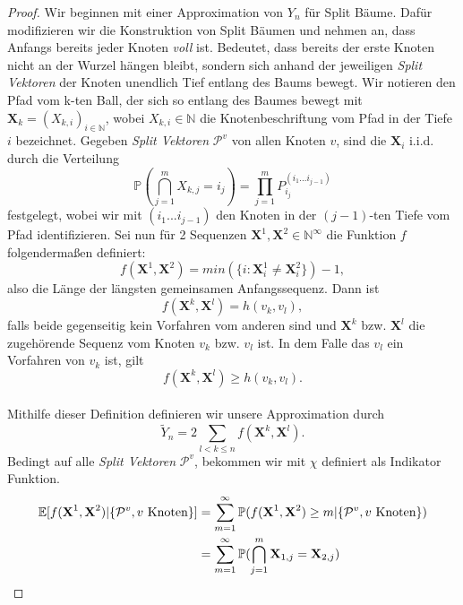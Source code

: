 \begin{proof}
  Wir beginnen mit einer Approximation von $Y_n$ für Split Bäume. Dafür modifizieren wir die Konstruktion von Split Bäumen und nehmen an, dass Anfangs bereits jeder Knoten \textit{voll} ist. Bedeutet, dass bereits der erste Knoten nicht an der Wurzel hängen bleibt, sondern sich anhand der jeweiligen \textit{Split Vektoren} der Knoten unendlich Tief entlang des Baums bewegt. Wir notieren den Pfad vom k-ten Ball, der sich so entlang des Baumes bewegt mit $\textbf{X}_k = (X_{k,i})_{i \in \mathbb{N}}$, wobei $X_{k,i} \in \mathbb{N}$ die Knotenbeschriftung vom Pfad in der  Tiefe $i$ bezeichnet. Gegeben \textit{Split Vektoren} $\mathcal{P}^{v}$ von allen Knoten $v$, sind die $\textbf{X}_i$ i.i.d. durch die Verteilung 
  \begin{equation}
    \label{independency sequence depth}
    \mathbb{P}(\bigcap_{j = 1}^{m}X_{k,j} = i_j) = \prod_{j=1}^{m}P_{i_j}^{(i_1...i_{j-1})}
  \end{equation}
  festgelegt, wobei wir mit $(i_1...i_{j-1})$ den Knoten in der $(j-1)$-ten Tiefe vom Pfad identifizieren. Sei nun für 2 Sequenzen $\textbf{X}^1,\textbf{X}^2 \in \mathbb{N}^{\infty}$ die Funktion $f$ folgendermaßen definiert:
  \[
    f(\textbf{X}^1,\textbf{X}^2) = min(\{i: \textbf{X}^1_i \neq \textbf{X}^2_i\}) - 1,
  \]
  also die Länge der längsten gemeinsamen Anfangssequenz. Dann ist 
  \[
    f(\textbf{X}^k,\textbf{X}^l) = h(v_k,v_l),
  \]
  falls beide gegenseitig kein Vorfahren vom anderen sind und $\textbf{X}^k$ bzw. $\textbf{X}^l$ die zugehörende Sequenz vom Knoten $v_k$ bzw. $v_l$ ist. In dem Falle das $v_l$ ein Vorfahren von $v_k$ ist, gilt 
  \begin{equation}
    \label{inequality for height}
    f(\textbf{X}^k,\textbf{X}^l) \geq h(v_k,v_l).
  \end{equation} \\
  Mithilfe dieser Definition definieren wir unsere Approximation durch 
  \[
    \tilde{Y}_n = 2\sum_{l < k \leq n}f(\textbf{X}^k,\textbf{X}^l).
  \]
Bedingt auf alle \textit{Split Vektoren} $\mathcal{P}^{v}$, bekommen wir mit $\chi$ definiert als Indikator Funktion. 
\begin{align}
\mathbb{E}[f(\textbf{X}^1,\textbf{X}^2)|\{\mathcal{P}^{v}, v \textnormal{ Knoten}\}] &=\sum_{m=1}^{\infty}\mathbb{P}({f(\textbf{X}^1,\textbf{X}^2) \geq m}|\{\mathcal{P}^{v}, v \textnormal{ Knoten}\}) \nonumber\\
&=\sum_{m=1}^{\infty}\mathbb{P}(\bigcap_{j=1}^{m}\textbf{X}_{1,j}=\textbf{X}_{2,j})   \nonumber\\

\end{align}
\end{proof}
